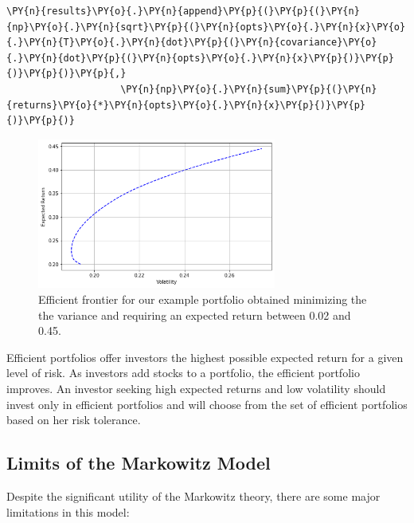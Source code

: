 \begin{tcolorbox}[breakable, size=fbox, boxrule=1pt, pad at break*=1mm,colback=cellbackground, colframe=cellborder]
\begin{Verbatim}[commandchars=\\\{\}]
    \PY{n}{results}\PY{o}{.}\PY{n}{append}\PY{p}{(}\PY{p}{(}\PY{n}{np}\PY{o}{.}\PY{n}{sqrt}\PY{p}{(}\PY{n}{opts}\PY{o}{.}\PY{n}{x}\PY{o}{.}\PY{n}{T}\PY{o}{.}\PY{n}{dot}\PY{p}{(}\PY{n}{covariance}\PY{o}{.}\PY{n}{dot}\PY{p}{(}\PY{n}{opts}\PY{o}{.}\PY{n}{x}\PY{p}{)}\PY{p}{)}\PY{p}{)}\PY{p}{,}
                    \PY{n}{np}\PY{o}{.}\PY{n}{sum}\PY{p}{(}\PY{n}{returns}\PY{o}{*}\PY{n}{opts}\PY{o}{.}\PY{n}{x}\PY{p}{)}\PY{p}{)}\PY{p}{)} 
\end{Verbatim}
\end{tcolorbox}

\begin{figure}[htb]
\centering
\includegraphics[width=0.7\textwidth]{figures/efficient_frontier.png}
\caption{Efficient frontier for our example portfolio obtained minimizing the the variance and requiring an expected return between 0.02 and 0.45.}
\label{fig:efficient_frontier}
\end{figure}

Efficient portfolios offer investors the highest possible expected return for a given level of risk. As investors add stocks to a portfolio, the efficient portfolio improves.
An investor seeking high expected returns and low volatility should invest only in efficient portfolios and will choose from the set of efficient portfolios based on her risk tolerance.
    
\subsection{Limits of the Markowitz Model}
 \label{limits-of-the-markowitz-model}
    
Despite the significant utility of the Markowitz theory, there are some major limitations in this model:
    
